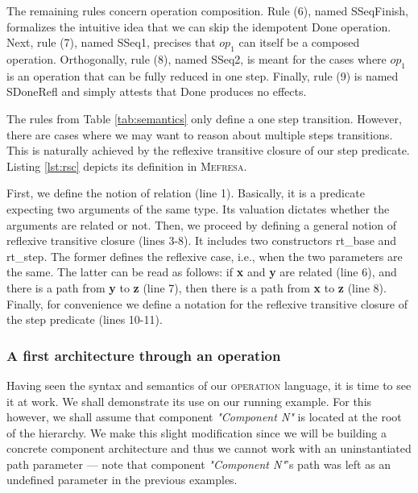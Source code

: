 		The remaining rules concern \textsf{operation} composition. Rule (6), named \textsf{SSeqFinish},
	formalizes the intuitive idea that we can skip the idempotent \textsf{Done} operation. Next,
	rule (7), named \textsf{SSeq1}, precises that $op_1$ can itself be a composed \textsf{operation}.
	Orthogonally, rule (8), named \textsf{SSeq2}, is meant for the cases where
	$op_1$ is an \textsf{operation} that can be fully reduced in one step. Finally,
	rule (9) is named \textsf{SDoneRefl} and simply attests that \textsf{Done} produces
	no effects.


 The rules from Table \ref{tab:semantics} only define a one step transition. 
 However, there are cases where we may want to reason
  about multiple steps transitions. This is naturally achieved by the reflexive transitive closure of
  our \textsf{step} predicate. Listing \ref{lst:rsc} depicts its definition in \textsc{Mefresa}.
  
  
  		


	\noindent First, we define the notion of \textsf{relation} (line 1). Basically, it is a predicate expecting two
	arguments of the same type. Its valuation dictates whether the arguments are related or not. Then, we proceed
	by defining a general notion of reflexive transitive closure (lines 3-8). It includes two constructors
	\textsf{rt\_base} and \textsf{rt\_step}. The former defines the reflexive case, i.e., when the two parameters
	are the same. The latter can be read as follows: if \textbf{x} and \textbf{y} are related (line 6), and there
	is a path from \textbf{y} to \textbf{z} (line 7), then there is a path from \textbf{x} to \textbf{z} (line 8).
	Finally, for convenience we define a notation for the reflexive transitive closure of the \textsf{step} predicate (lines 10-11).


\subsubsection{A first architecture through an \textsf{operation}}

	
		Having seen the syntax and semantics of our \textsc{operation} language, it is time to see it at work.
	We shall demonstrate its use on our running example. For this however, we shall assume that
	\textsf{component} \textit{"Component N"} is located at the root of the hierarchy. We make this 
	slight modification since we will be building a concrete \textsf{component} architecture and thus
	we cannot work with an uninstantiated \textsf{path} parameter --- note that \textsf{component} \textit{"Component N"}'s
	\textsf{path} was left as an undefined parameter in the previous examples.
		
